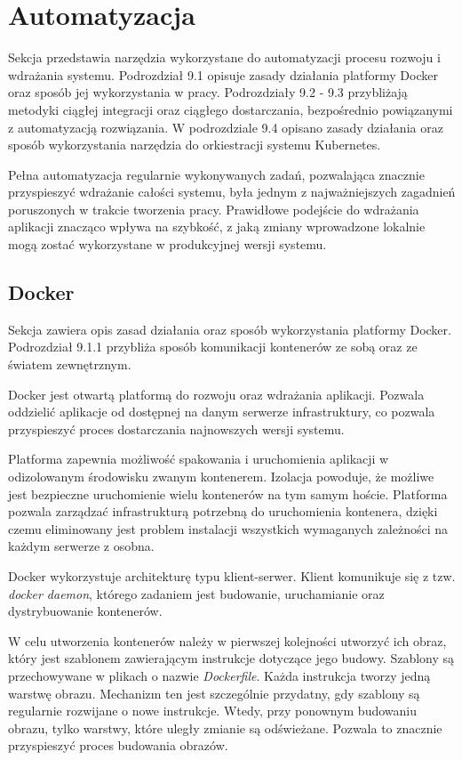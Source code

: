 \newpage
\section{Automatyzacja}
Sekcja przedstawia narzędzia wykorzystane do automatyzacji procesu rozwoju i wdrażania
systemu. Podrozdział 9.1 opisuje zasady działania platformy Docker oraz sposób jej 
wykorzystania w pracy. Podrozdziały 9.2 - 9.3 przybliżają metodyki ciągłej
integracji oraz ciągłego dostarczania, bezpośrednio powiązanymi z automatyzacją
rozwiązania. W podrozdziale 9.4 opisano zasady działania oraz sposób wykorzystania
narzędzia do orkiestracji systemu Kubernetes.

Pełna automatyzacja regularnie wykonywanych zadań, pozwalająca znacznie przyspieszyć 
wdrażanie całości systemu, była jednym z najważniejszych zagadnień poruszonych w 
trakcie tworzenia pracy. Prawidłowe podejście do wdrażania aplikacji znacząco wpływa 
na szybkość, z jaką zmiany wprowadzone lokalnie mogą zostać wykorzystane w 
produkcyjnej wersji systemu. 

\subsection{Docker}
Sekcja zawiera opis zasad działania oraz sposób wykorzystania platformy Docker.
Podrozdział 9.1.1 przybliża sposób komunikacji kontenerów ze sobą oraz ze
światem zewnętrznym. 

Docker jest otwartą platformą do rozwoju oraz wdrażania aplikacji. Pozwala oddzielić aplikacje od
dostępnej na danym serwerze infrastruktury, co pozwala przyspieszyć proces dostarczania najnowszych
wersji systemu. 

Platforma zapewnia możliwość spakowania i uruchomienia aplikacji w odizolowanym środowisku
zwanym kontenerem. Izolacja powoduje, że możliwe jest bezpieczne uruchomienie wielu kontenerów na tym
samym hoście. Platforma pozwala zarządzać infrastrukturą potrzebną do uruchomienia kontenera, dzięki
czemu eliminowany jest problem instalacji wszystkich wymaganych zależności na każdym serwerze z osobna.

Docker wykorzystuje architekturę typu klient-serwer. Klient komunikuje się z tzw. \textit{docker daemon}, którego
zadaniem jest budowanie, uruchamianie oraz dystrybuowanie kontenerów. 

W celu utworzenia kontenerów należy w pierwszej kolejności utworzyć ich obraz, który jest szablonem
zawierającym instrukcje dotyczące jego budowy. Szablony są przechowywane w plikach o nazwie \textit{Dockerfile}.
Każda instrukcja tworzy jedną warstwę obrazu. Mechanizm ten jest szczególnie przydatny, gdy szablony są
regularnie rozwijane o nowe instrukcje. Wtedy, przy ponownym budowaniu obrazu, tylko warstwy, które
uległy zmianie są odświeżane. Pozwala to znacznie przyspieszyć proces budowania obrazów.

